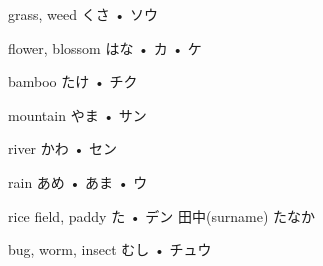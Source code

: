 



\setcounter{cardnum}{33}

		{grass, weed}
		{くさ • ソウ}
		{}{}
		{}{}
		{}{}
		{}{}
		{}{}

		{flower, blossom}
		{はな • カ • ケ}
		{}{}
		{}{}
		{}{}
		{}{}
		{}{}

		{bamboo}
		{たけ • チク}
		{}{}
		{}{}
		{}{}
		{}{}
		{}{}

		{mountain}
		{やま • サン}
		{}{}
		{}{}
		{}{}
		{}{}
		{}{}

		{river}
		{かわ • セン}
		{}{}
		{}{}
		{}{}
		{}{}
		{}{}

		{rain}
		{あめ • あま • ウ}
		{}{}
		{}{}
		{}{}
		{}{}
		{}{}

		{rice field, paddy}
		{た • デン}
		{田中}{(surname) たなか}
		{}{}
		{}{}
		{}{}
		{}{}

		{bug, worm, insect}
		{むし • チュウ}
		{}{}
		{}{}
		{}{}
		{}{}
		{}{}

